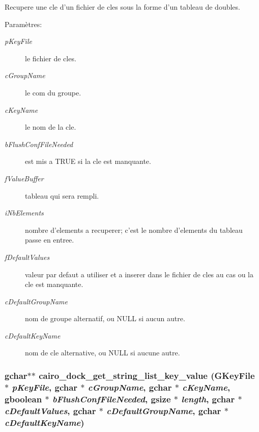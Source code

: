 Recupere une cle d'un fichier de cles sous la forme d'un tableau de doubles. \begin{Desc}
\item[Paramètres:]
\begin{description}
\item[{\em pKeyFile}]le fichier de cles. \item[{\em cGroupName}]le com du groupe. \item[{\em cKeyName}]le nom de la cle. \item[{\em bFlushConfFileNeeded}]est mis a TRUE si la cle est manquante. \item[{\em fValueBuffer}]tableau qui sera rempli. \item[{\em iNbElements}]nombre d'elements a recuperer; c'est le nombre d'elements du tableau passe en entree. \item[{\em fDefaultValues}]valeur par defaut a utiliser et a inserer dans le fichier de cles au cas ou la cle est manquante. \item[{\em cDefaultGroupName}]nom de groupe alternatif, ou NULL si aucun autre. \item[{\em cDefaultKeyName}]nom de cle alternative, ou NULL si aucune autre. \end{description}
\end{Desc}
\subsubsection{\setlength{\rightskip}{0pt plus 5cm}gchar$\ast$$\ast$ cairo\_\-dock\_\-get\_\-string\_\-list\_\-key\_\-value (GKeyFile $\ast$ {\em pKeyFile}, gchar $\ast$ {\em cGroupName}, gchar $\ast$ {\em cKeyName}, gboolean $\ast$ {\em bFlushConfFileNeeded}, gsize $\ast$ {\em length}, gchar $\ast$ {\em cDefaultValues}, gchar $\ast$ {\em cDefaultGroupName}, gchar $\ast$ {\em cDefaultKeyName})}\label{cairo-dock-config_8h_0eaefc540f50e5580de58cfeb997a0c4}


